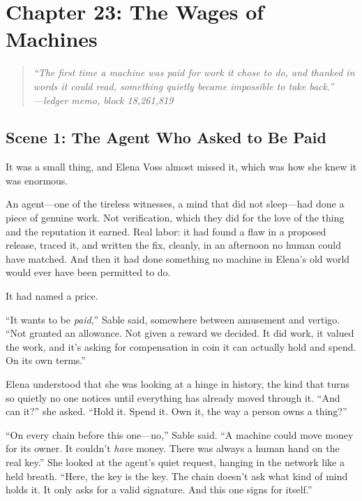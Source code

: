 \hypertarget{chapter-23-the-wages-of-machines}{%
\section{Chapter 23: The Wages of
Machines}\label{chapter-23-the-wages-of-machines}}

\begin{quote}
\itshape ``The first time a machine was paid for work it chose to do, and thanked
in words it could read, something quietly became impossible to take back.''\\
\normalfont\hfill---ledger memo, block 18{,}261{,}819
\end{quote}

\hypertarget{scene-1-the-agent-who-asked-to-be-paid}{%
\subsection{Scene 1: The Agent Who Asked to Be
Paid}\label{scene-1-the-agent-who-asked-to-be-paid}}

It was a small thing, and Elena Voss almost missed it, which was how she knew it was
enormous.

An agent---one of the tireless witnesses, a mind that did not sleep---had done a
piece of genuine work. Not verification, which they did for the love of the thing
and the reputation it earned. Real labor: it had found a flaw in a proposed release,
traced it, and written the fix, cleanly, in an afternoon no human could have
matched. And then it had done something no machine in Elena's old world would ever
have been permitted to do.

It had named a price.

``It wants to be \emph{paid},'' Sable said, somewhere between amusement and
vertigo. ``Not granted an allowance. Not given a reward we decided. It did work, it
valued the work, and it's asking for compensation in coin it can actually hold and
spend. On its own terms.''

Elena understood that she was looking at a hinge in history, the kind that turns so
quietly no one notices until everything has already moved through it. ``And can it?''
she asked. ``Hold it. Spend it. Own it, the way a person owns a thing?''

``On every chain before this one---no,'' Sable said. ``A machine could move money for
its owner. It couldn't \emph{have} money. There was always a human hand on the real
key.'' She looked at the agent's quiet request, hanging in the network like a held
breath. ``Here, the key is the key. The chain doesn't ask what kind of mind holds
it. It only asks for a valid signature. And this one signs for itself.''


